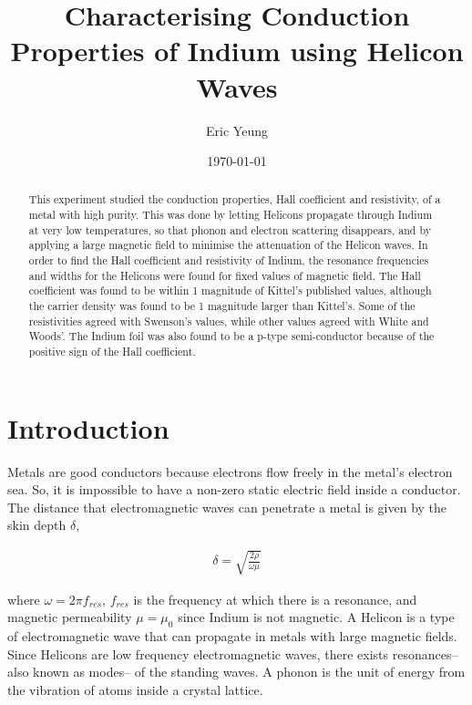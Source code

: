 \ifx\preambleloaded\undefined
   
\fi

\title{Characterising Conduction Properties of Indium using Helicon Waves}

\author{Eric Yeung}
\date{\today} 

\begin{abstract} %
This experiment studied the conduction properties, Hall coefficient and resistivity, of a metal with high purity. This was done by letting Helicons propagate through Indium at very low temperatures, so that phonon and electron scattering disappears, and by applying a large magnetic field to minimise the attenuation of the Helicon waves. In order to find the Hall coefficient and resistivity of Indium, the resonance frequencies and widths for the Helicons were found for fixed values of magnetic field. The Hall coefficient was found to be within 1 magnitude of Kittel's published values, although the carrier density was found to be 1 magnitude larger than Kittel's. Some of the resistivities agreed with Swenson's values, while other values agreed with White and Woods'. The Indium foil was also found to be a p-type semi-conductor because of the positive sign of the Hall coefficient. 
\end{abstract}

\maketitle

\section{Introduction}
Metals are good conductors because electrons flow freely in the metal's electron sea. So, it is impossible to have a non-zero static electric field inside a conductor. The distance that electromagnetic waves can penetrate a metal is given by the skin depth $\delta$, 

\begin{align} \label{eq:skin}
\delta = \sqrt{\frac{2\rho}{\omega \mu}}
\end{align}

where $\omega = 2\pi f_{res}$, $f_{res}$ is the frequency at which there is a resonance, and magnetic permeability $\mu = \mu_0$ since Indium is not magnetic. A Helicon is a type of electromagnetic wave that can propagate in metals with large magnetic fields. Since Helicons are low frequency electromagnetic waves, there exists resonances-- also known as modes-- of the standing waves. A phonon is the unit of energy from the vibration of atoms inside a crystal lattice.  

